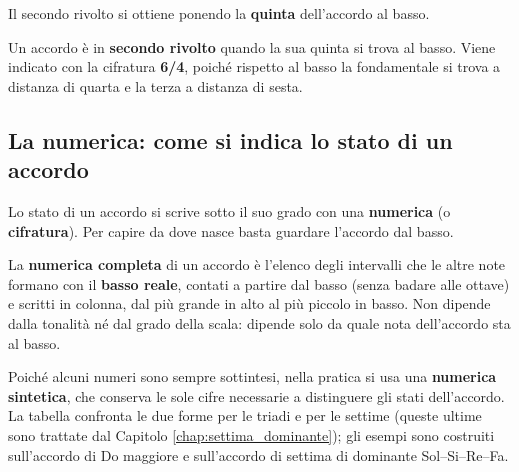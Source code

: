 Il secondo rivolto si ottiene ponendo la \textbf{quinta} dell'accordo al basso.

\begin{definizione}
	\label{def:secondo_rivolto}
	Un accordo è in \textbf{secondo rivolto} quando la sua quinta si trova al basso. Viene indicato con la cifratura \textbf{6/4}, poiché rispetto al basso la fondamentale si trova a distanza di quarta e la terza a distanza di sesta.
\end{definizione}

\begin{esempio}
	\label{ex:secondo_rivolto_triadi}
\end{esempio}

\subsection{La numerica: come si indica lo stato di un accordo}
\label{subsec:cifratura_accordi}

Lo stato di un accordo si scrive sotto il suo grado con una \textbf{numerica} (o \textbf{cifratura}). Per capire da dove nasce basta guardare l'accordo dal basso.

\begin{definizione}
	\label{def:numerica_accordo}
	La \textbf{numerica completa} di un accordo è l'elenco degli intervalli che le altre note formano con il \textbf{basso reale}, contati a partire dal basso (senza badare alle ottave) e scritti in colonna, dal più grande in alto al più piccolo in basso. Non dipende dalla tonalità né dal grado della scala: dipende solo da quale nota dell'accordo sta al basso.
\end{definizione}

Poiché alcuni numeri sono sempre sottintesi, nella pratica si usa una \textbf{numerica sintetica}, che conserva le sole cifre necessarie a distinguere gli stati dell'accordo. La tabella confronta le due forme per le triadi e per le settime (queste ultime sono trattate dal Capitolo \ref{chap:settima_dominante}); gli esempi sono costruiti sull'accordo di Do maggiore e sull'accordo di settima di dominante Sol--Si--Re--Fa.


